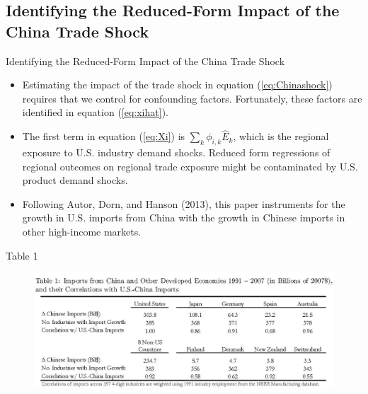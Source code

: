 \documentclass[aspectratio=169]{beamer}
\begin{document}

\subsection{Identifying the Reduced-Form Impact of the China Trade Shock}


\begin{frame}{Identifying the Reduced-Form Impact of the China Trade Shock}

\begin{itemize}
    \item<1-> Estimating the impact of the trade shock in equation (\ref{eq:Chinashock}) requires that we control for confounding factors.  Fortunately, these factors are identified in equation (\ref{eq:xihat}).
    \item<2-> The first term in equation (\ref{eq:Xi}) is $ \sum_{k} \phi_{i,k} \hat{E}_{k} $, which is the regional exposure to U.S. industry demand shocks.  Reduced form regressions of regional outcomes on regional trade exposure might be contaminated by U.S. product demand shocks.
    \item<3-> Following Autor, Dorn, and Hanson (2013), this paper instruments for the growth in U.S. imports from China with the growth in Chinese imports in other high-income markets.
\end{itemize}
    
\end{frame}


\begin{frame}{Table 1}

\begin{figure}
    \centering
    \includegraphics[scale=0.82]{AutorDornHansonTable1.jpg}
    \label{fig:Tab1}
\end{figure}
    
\end{frame}
\end{document}
